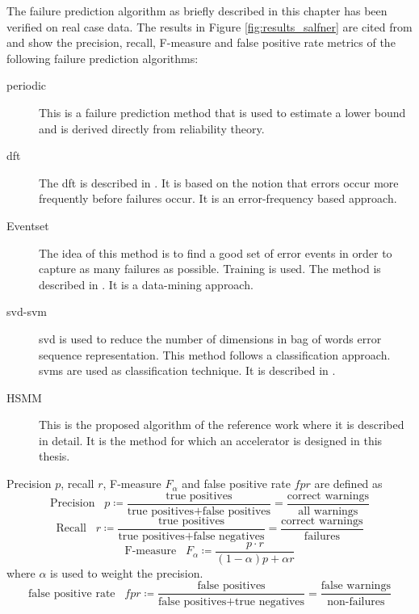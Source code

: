 \documentclass[mscthesis]{usiinfthesis}
\begin{document}
The failure prediction algorithm as briefly described in this chapter has been
verified on real case data. The results in Figure \ref{fig:results_salfner} are
cited from \cite{salfner08} and show the precision, recall, F-measure and false
positive rate metrics of the following failure prediction algorithms:
\begin{description}
    \item[periodic] This is a failure prediction method that is used to estimate
        a lower bound and is derived directly from reliability theory.
    \item[\acrshort{dft}] The \acrfull{dft} is described in \cite{lin88}. It is
        based on the notion that errors occur more frequently before failures
        occur. It is an error-frequency based approach.
    \item[Eventset] The idea of this method is to find a good set of error
        events in order to capture as many failures as possible. Training is
        used. The method is described in \cite{ICDM02_Vilalta}. It is
        a data-mining approach.
    \item[\acrshort{svd}-\acrshort{svm}] \acrfull{svd} is used to reduce the
        number of dimensions in bag of words error sequence representation.
        This method follows a classification approach. \glspl{svm} are used
        as classification technique. It is described in \cite{domeniconi02}.
    \item[HSMM] This is the proposed algorithm of the reference work
        \cite{salfner08} where it is described in detail. It is the method for
        which an accelerator is designed in this thesis.
\end{description}
Precision $p$, recall $r$, F-measure $F_\alpha$ and false positive rate $fpr$
are defined as
\begin{equation}
    \text{Precision} \;\;\; p
        \coloneqq \frac{\text{true positives}}{\text{true positives}
        +\text{false positives}}
        = \frac{\text{correct warnings}}{\text{all warnings}}
\end{equation}
\begin{equation}
    \text{Recall} \;\;\; r 
        \coloneqq \frac{\text{true positives}}{\text{true positives}
        +\text{false negatives}}
        = \frac{\text{correct warnings}}{\text{failures}}
\end{equation}
\begin{equation}
    \text{F-measure} \;\;\; F_{\alpha}
        \coloneqq \frac{p \cdot r}{(1-\alpha)p + \alpha r}
\end{equation}
where $\alpha$ is used to weight the precision.
\begin{equation}
    \text{false positive rate} \;\;\; fpr
    \coloneqq \frac{\text{false positives}}
        {\text{false positives}+\text{true negatives}}
        = \frac{\text{false warnings}}{\text{non-failures}}
\end{equation}
\end{document}
